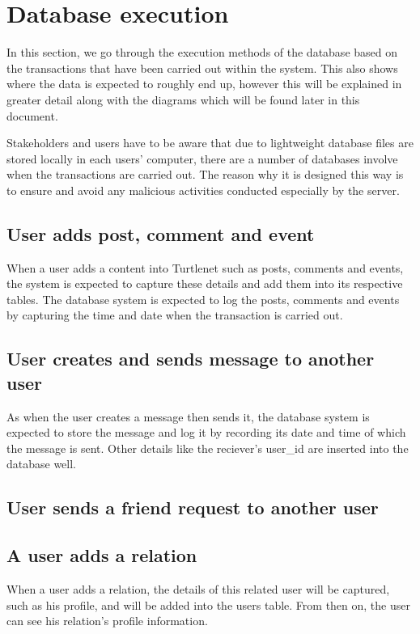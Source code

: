 
\section{Database execution }
In this section, we go through the execution methods of the database based on the transactions that have been carried out within the system. This also shows where the data is expected to roughly end up, however this will be explained in greater detail along with the diagrams which will be found later in this document.

Stakeholders and users have to be aware that due to lightweight database files are stored locally in each users' computer, there are a number of databases involve when the transactions are carried out. The reason why it is designed this way is to ensure and avoid any malicious activities conducted especially by the server. 

\subsection{User adds post, comment and event}
When a user adds a content into Turtlenet such as posts, comments and events, the system is expected to capture these details and add them into its respective tables. The database system is expected to log the posts, comments and events by capturing the time and date when the transaction is carried out.

\subsection{User creates and sends message to another user}
As when the user creates a message then sends it, the database system is expected to store the message and log it by recording its date and time of which the message is sent. Other details like the reciever's user\_id are inserted into the database well.

\subsection{User sends a friend request to another user}

\subsection{A user adds a relation}
When a user adds a relation, the details of this related user will be captured, such as his profile, and will be added into the users table. From then on, the user can see his relation's profile information. 

